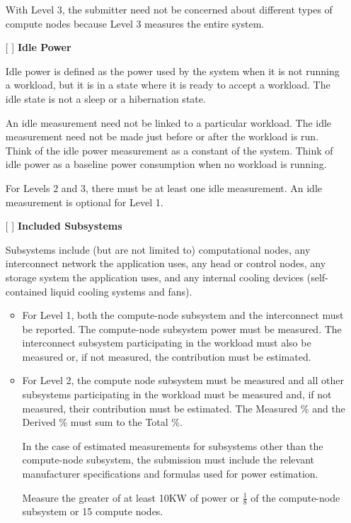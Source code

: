 \begin{itemize}
With Level 3, the submitter need not be concerned about different types of compute nodes because Level 3 measures the entire system.


\item[{[ ]}]
\textbf{Idle Power}

Idle power is defined as the power used by the system when it is not running a workload, but it is in a state where it is ready to accept a workload. The idle state is not a sleep or a hibernation state.

An idle measurement need not be linked to a particular workload. The idle measurement need not be made just before or after the workload is run. Think of the idle power measurement as a constant of the system. Think of idle power as a baseline power consumption when no workload is running. 

For Levels 2 and 3, there must be at least one idle measurement. An idle measurement is optional for Level 1. 

\newpage
\item[{[ ]}]
\textbf{Included Subsystems}

Subsystems include (but are not limited to) computational nodes, any interconnect network the application uses, any head or control nodes, any storage system the application uses, and any internal cooling devices (self-contained liquid cooling systems and fans).  

\begin{itemize}
\item
For Level 1, both the compute-node subsystem and the interconnect must be reported.  
The compute-node subsystem power must be measured. 
The interconnect subsystem participating in the workload must also be measured or, if not measured, the contribution must be estimated.


\item
For Level 2, the compute node subsystem must be measured and all other subsystems participating in the workload must be measured and, if not measured, their contribution must be estimated. The Measured \% and the Derived \% must sum to the Total \%.

In the case of estimated measurements for subsystems other than 
the compute-node subsystem, the submission must include the relevant 
manufacturer specifications and formulas used for power estimation. 

Measure the greater of at least 10KW of power or $ \frac{1}{8} $ of the compute-node subsystem or 15 compute nodes.


\end{itemize}
\end{itemize}
